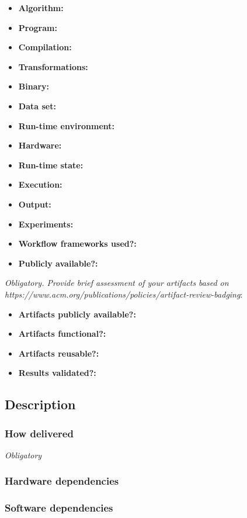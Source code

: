 \documentclass{sigplanconf}
\begin{document}
{\small
\begin{itemize}
  \item {\bf Algorithm: }
  \item {\bf Program: }
  \item {\bf Compilation: }
  \item {\bf Transformations: }
  \item {\bf Binary: }
  \item {\bf Data set: }
  \item {\bf Run-time environment: }
  \item {\bf Hardware: }
  \item {\bf Run-time state: }
  \item {\bf Execution: }
  \item {\bf Output: }
  \item {\bf Experiments: }
  \item {\bf Workflow frameworks used?: }
  \item {\bf Publicly available?: }
\end{itemize}

{\em Obligatory. Provide brief assessment of your artifacts 
based on {\em https://www.acm.org/publications/policies/artifact-review-badging}}:

\begin{itemize}
  \item {\bf Artifacts publicly available?: }
  \item {\bf Artifacts functional?:}
  \item {\bf Artifacts reusable?:}
  \item {\bf Results validated?:}
\end{itemize}

\subsection{Description}

\subsubsection{How delivered}

{\em Obligatory}

\subsubsection{Hardware dependencies}

\subsubsection{Software dependencies}

}
\end{document}
